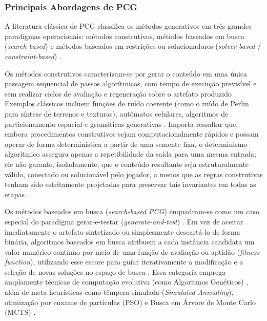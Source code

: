 \subsubsection{Principais Abordagens de PCG}
\label{sec:abordagens_pcg}

A literatura clássica de PCG classifica os métodos generativos em três grandes paradigmas operacionais: métodos construtivos, métodos baseados em busca (\textit{search-based}) e métodos baseados em restrições ou solucionadores (\textit{solver-based} / \textit{constraint-based}) \cite{pcgbook, summerville2018procedural, maleki2024procedural}.

Os métodos construtivos caracterizam-se por gerar o conteúdo em uma única passagem sequencial de passos algorítmicos, com tempo de execução previsível e sem realizar ciclos de avaliação e regeneração sobre o artefato produzido \cite{shaker2016constructive, summerville2018procedural}. Exemplos clássicos incluem funções de ruído coerente (como o ruído de Perlin para síntese de terrenos e texturas), autômatos celulares, algoritmos de particionamento espacial e gramáticas generativas \cite{linden2014dungeons, shaker2016constructive, maleki2024procedural}. Importa ressaltar que, embora procedimentos construtivos sejam computacionalmente rápidos e possam operar de forma determinística a partir de uma semente fixa, o determinismo algorítmico assegura apenas a repetibilidade da saída para uma mesma entrada; ele não garante, isoladamente, que o conteúdo resultante seja estruturalmente válido, conectado ou solucionável pelo jogador, a menos que as regras construtivas tenham sido estritamente projetadas para preservar tais invariantes em todas as etapas \cite{linden2014dungeons, shaker2016constructive}.

Os métodos baseados em busca (\textit{search-based PCG}) enquadram-se como um caso especial do paradigma gerar-e-testar (\textit{generate-and-test}) \cite{pcgbook, maleki2024procedural}. Em vez de aceitar imediatamente o artefato sintetizado ou simplesmente descartá-lo de forma binária, algoritmos baseados em busca atribuem a cada instância candidata um valor numérico contínuo por meio de uma função de avaliação ou aptidão (\textit{fitness function}), utilizando esse escore para guiar iterativamente a modificação e a seleção de novas soluções no espaço de busca \cite{linden2014dungeons, araujo2018geracao, maleki2024procedural}. Essa categoria emprega amplamente técnicas de computação evolutiva (como Algoritmos Genéticos) \cite{linden2014dungeons, maleki2024procedural}, além de meta-heurísticas como têmpera simulada (\textit{Simulated Annealing}), otimização por enxame de partículas (PSO) e Busca em Árvore de Monte Carlo (MCTS) \cite{maleki2024procedural, xu2025constraint}.


